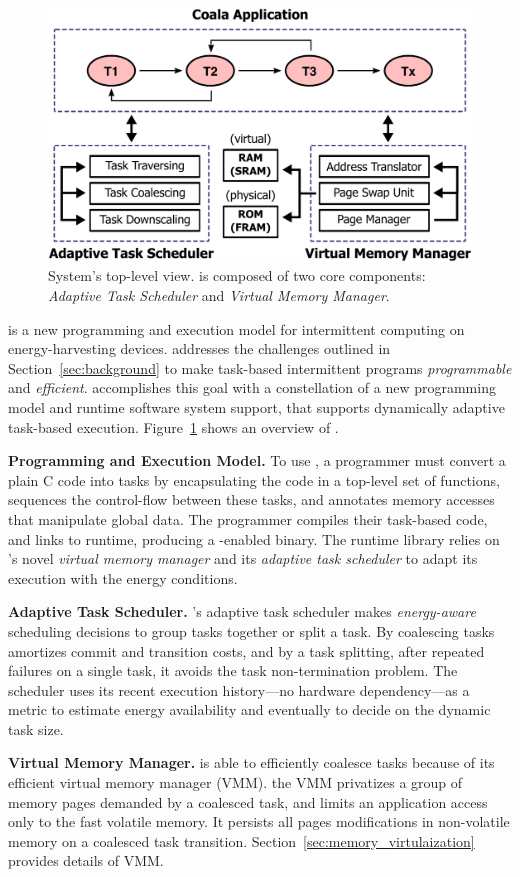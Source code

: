 \begin{figure}
	\centering
	\includegraphics[width=\columnwidth]{figures/overview.pdf}
	\caption{System's top-level view. \sys is composed of two core components: \emph{Adaptive Task Scheduler} and \emph{Virtual Memory Manager}.}
	\label{fig:system_overview}
\end{figure}
%
\sys is a new programming and execution model for intermittent computing on energy-harvesting devices. \sys addresses the challenges outlined in Section~\ref{sec:background} to make task-based intermittent programs {\em programmable} and {\em efficient}. \sys accomplishes this goal with a constellation of a new programming model and runtime software system support, that supports dynamically adaptive task-based execution. Figure~\ref{fig:system_overview} shows an overview of \sys.

\textbf{Programming and Execution Model.}  To use \sys, a programmer must convert a plain C code into tasks by encapsulating the code in a top-level set of functions, sequences the control-flow between these tasks, and annotates memory accesses that manipulate global data.
The programmer compiles their task-based code, and links to \sys runtime,
producing a \sys-enabled binary. The runtime library relies on \sys's novel
{\em virtual memory manager} and its {\em adaptive task scheduler} to adapt its execution with the energy conditions.

\textbf{Adaptive Task Scheduler.} 
\sys's adaptive task scheduler makes \emph{energy-aware} scheduling decisions to group tasks together or split a task. By coalescing tasks \sys amortizes commit and transition costs, and by a task splitting, after repeated failures on a single task, it avoids the task non-termination problem. The scheduler uses its recent execution history---no hardware dependency---as a metric to estimate energy availability and eventually to decide on the dynamic task size. 

\textbf{Virtual Memory Manager.} \sys is able to efficiently coalesce
tasks because of its efficient virtual memory manager (VMM).
the VMM privatizes a group of memory pages demanded by a coalesced task, and limits an application access only to the fast volatile memory. It persists all pages modifications in non-volatile memory on a coalesced task transition. Section~\ref{sec:memory_virtulaization} provides details of VMM.

